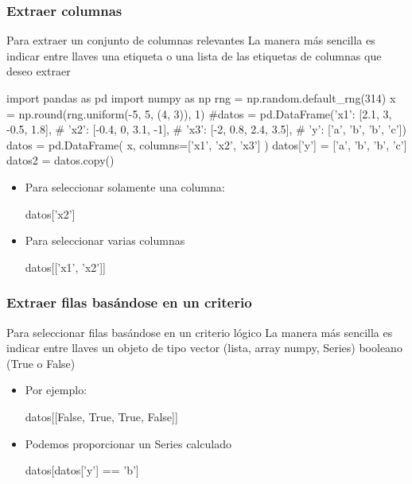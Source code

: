 \documentclass[9pt]{beamer}
\begin{document}
\begin{frame}[fragile]
  \frametitle{Extraer columnas}
  \begin{block}{Para extraer un conjunto de columnas relevantes}
    La manera más sencilla es indicar  entre llaves una etiqueta o una lista de las etiquetas de columnas que deseo extraer
  \end{block}
  \begin{pyconcode}
import pandas as pd
import numpy as np
rng = np.random.default_rng(314)
x = np.round(rng.uniform(-5, 5, (4, 3)), 1)
#datos = pd.DataFrame({'x1': [2.1, 3, -0.5, 1.8],
#  'x2': [-0.4, 0, 3.1, -1],
#  'x3': [-2, 0.8, 2.4, 3.5],
#  'y': ['a', 'b', 'b', 'c']})
datos = pd.DataFrame(
    x,
    columns=['x1', 'x2', 'x3']
    )
datos['y'] = ['a', 'b', 'b', 'c']
datos2 = datos.copy()
  \end{pyconcode}
\pause
\begin{itemize}
  \item<2-> Para seleccionar solamente una columna:
    \begin{pyconsole}
datos['x2']
    \end{pyconsole}
  \item<3-> Para seleccionar varias columnas
        \begin{pyconsole}
datos[['x1', 'x2']]
        \end{pyconsole}
\end{itemize}
\end{frame}
\begin{frame}[fragile]
  \frametitle{Extraer filas basándose en un criterio}
  \begin{block}{Para seleccionar filas basándose en un criterio lógico}
    La manera más sencilla es indicar entre llaves un objeto de tipo vector (lista, array numpy, Series)  booleano (True o False)
  \end{block}
\pause
\begin{itemize}
  \item<2-> Por ejemplo:
    \begin{pyconsole}
datos[[False, True, True, False]]
    \end{pyconsole}
  \item<3-> Podemos proporcionar un Series calculado
        \begin{pyconsole}
datos[datos['y'] == 'b']
        \end{pyconsole}
\end{itemize}
\end{frame}
\end{document}

